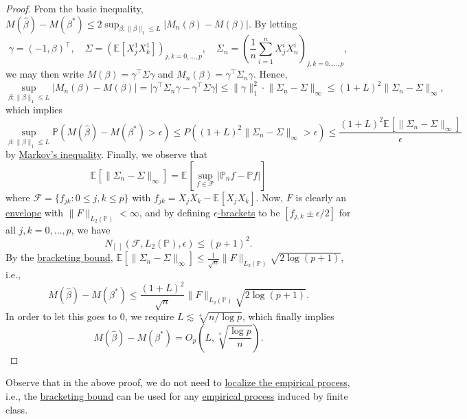 \begin{proof}
	From the basic inequality, \(M(\hat{\beta} ) - M(\beta ^{\ast} ) \leq 2 \sup _{\beta \colon \lVert \beta  \rVert _1 \leq L} \vert M_n(\beta ) - M(\beta ) \vert \). By letting
	\[
		\gamma = (-1, \beta )^{\top},\quad
		\Sigma = \left( \mathbb{E}_{}\left[X_j^1 X_k^1 \right] \right) _{j, k = 0, \dots , p},\quad
		\Sigma _n = \left( \frac{1}{n} \sum_{i=1}^{n} X_j^i X_n^i \right)_{j, k = 0, \dots , p} ,
	\]
	we may then write \(M(\beta ) = \gamma ^{\top} \Sigma \gamma\) and \(M_n(\beta ) = \gamma ^{\top} \Sigma _n \gamma\). Hence,
	\[
		\sup _{\beta \colon \lVert \beta  \rVert _1 \leq L} \vert M_n(\beta ) - M(\beta ) \vert
		= \vert \gamma ^{\top} \Sigma _n \gamma - \gamma ^{\top} \Sigma \gamma  \vert
		\leq \lVert \gamma  \rVert _1^2 \cdot \lVert \Sigma _n - \Sigma  \rVert _\infty
		\leq (1 + L)^2 \lVert \Sigma _n - \Sigma  \rVert _\infty ,
	\]
	which implies
	\[
		\sup _{\beta \colon \lVert \beta  \rVert _1 \leq L} \mathbb{P} (M(\hat{\beta} ) - M(\beta ^{\ast} ) > \epsilon )
		\leq P((1 + L)^2 \lVert \Sigma _n - \Sigma  \rVert _\infty > \epsilon )
		\leq \frac{(1 + L)^2 \mathbb{E}_{}\left[\lVert \Sigma _n - \Sigma  \rVert _\infty  \right] }{\epsilon }
	\]
	by \hyperref[lma:Markov-inequality]{Markov's inequality}. Finally, we observe that
	\[
		\mathbb{E}_{}\left[\lVert \Sigma _n - \Sigma  \rVert _\infty  \right]
		= \mathbb{E}_{}\left[\sup _{f\in \mathscr{F} } \vert \mathbb{P} _n f - \mathbb{P} f \vert  \right]
	\]
	where \(\mathscr{F} = \{ f_{jk} \colon 0 \leq j, k \leq p\} \) with \(f_{jk} = X_j X_k - \mathbb{E}_{}\left[X_j X_k \right] \). Now, \(F\) is clearly an \hyperref[def:envelope]{envelope} with \(\lVert F \rVert _{L_2(\mathbb{P} )} < \infty \), and by defining \hyperref[def:eps-bracket]{\(\epsilon\)-brackets} to be \([f_{j,k} \pm \epsilon / 2 ]\) for all \(j, k = 0, \dots , p\), we have
	\[
		N_{[\ ]}(\mathscr{F} , L_2(\mathbb{P} ), \epsilon ) \leq (p + 1) ^2.
	\]
	By the \hyperref[thm:bracketing-bound]{bracketing bound}, \(\mathbb{E}_{}\left[\lVert \Sigma _n - \Sigma  \rVert _\infty  \right] \leq \frac{1}{\sqrt{n} } \lVert F \rVert _{L_2(\mathbb{P} )} \sqrt{2 \log (p+1)} \), i.e.,
	\[
		M(\hat{\beta} ) - M(\beta ^{\ast} )
		\leq \frac{(1 + L)^2 }{\sqrt{n} } \lVert F \rVert _{L_2(\mathbb{P} )} \sqrt{2 \log (p + 1)} .
	\]
	In order to let this goes to \(0\), we require \(L \lesssim \sqrt[4]{n / \log p}\), which finally implies
	\[
		M(\hat{\beta} ) - M(\beta ^{\ast} ) = O_p \left( L, \sqrt[4]{\frac{\log p}{n}} \right).
	\]
\end{proof}

\begin{remark}
	Observe that in the above proof, we do not need to \hyperref[def:localized-EP]{localize the empirical process}, i.e., the \hyperref[thm:bracketing-bound]{bracketing bound} can be used for any \hyperref[def:EP]{empirical process} induced by finite class.
\end{remark}